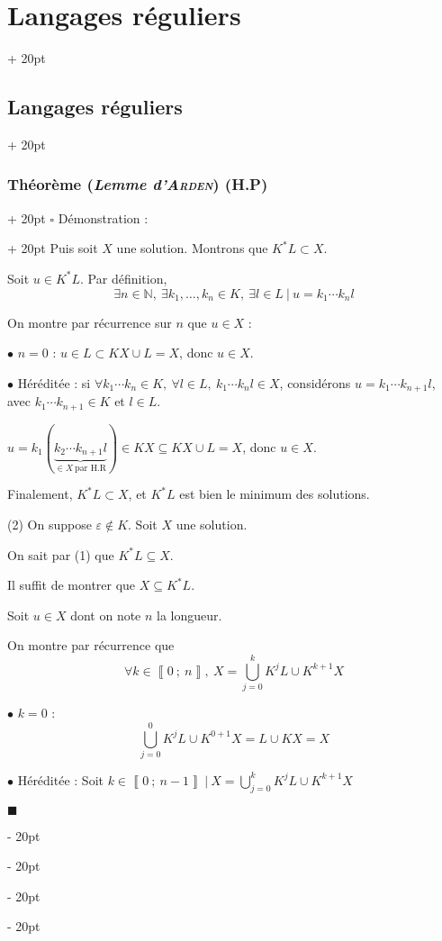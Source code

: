 \documentclass[a4paper, 12pt, twoside]{article}
\newcommand{\N}{\mathbb{N}} %
\newcommand{\nset}[2]{\left\llbracket #1\ ;\ #2 \right\rrbracket}
\newcommand{\ind}[1][20pt]{\advance\leftskip + #1}
\newcommand{\deind}[1][20pt]{\advance\leftskip - #1}
\newenvironment{indt}[2][20pt]{#2 \par \ind[#1]}{\par \deind} %
\newenvironment{proof}[1][{Démonstration :}]{\begin{indt}{$\square$ #1}}{$\blacksquare$ \end{indt}}
\begin{document}
\begin{indt}{\section{Langages réguliers}}
\begin{indt}{\subsection{Langages réguliers}}
\begin{indt}{\subsubsection{Théorème (\textit{Lemme d'\textsc{Arden}}) (H.P)}}
\begin{proof}
                    Puis soit $X$ une solution. Montrons que $K^* L \subset X$.

                    Soit $u \in K^* L$. Par définition,
                    \[
                        \exists n \in \N,\ \exists k_1, \ldots, k_n \in K,\ \exists l \in L\ |\
                        u = k_1 \cdots k_n l
                    \]

                    On montre par récurrence sur $n$ que $u \in X$ :

                    $\bullet$ $n = 0$ :
                    $u \in L \subset KX\cup L = X$, donc $u \in X$.

                    \vspace{6pt}
                    
                    $\bullet$ Héréditée :
                    si $\forall k_1 \cdots k_n \in K,\ \forall l \in L,\ k_1 \cdots k_n l \in X$, considérons $u = k_1 \cdots k_{n + 1} l$, avec $k_1 \cdots k_{n + 1} \in K$ et $l \in L$.

                    $u = k_1(\underbrace{k_2 \cdots k_{n + 1}l}_{\in X\ \text{par H.R}}) \in KX \subseteq KX \cup L = X$, donc $u \in X$.

                    Finalement, $K^* L \subset X$, et $K^*L$ est bien le minimum des solutions.

                    \vspace{12pt}
                    
                    (2) On suppose $\varepsilon \notin K$. Soit $X$ une solution.

                    On sait par (1) que $K^*L \subseteq X$.

                    Il suffit de montrer que $X \subseteq K^* L$.

                    Soit $u \in X$ dont on note $n$ la longueur.

                    On montre par récurrence que
                    \[
                        \forall k \in \nset 0 n,\ X = \bigcup_{j = 0}^k K^j L \cup K^{k + 1} X
                    \]

                    \vspace{6pt}
                    
                    $\bullet$ $k = 0$ :
                    \[
                        \bigcup_{j = 0}^0 K^j L \cup K^{0 + 1} X = L \cup KX = X
                    \]

                    $\bullet$ Héréditée : Soit $k \in \nset 0 {n - 1} \ |\ X = \displaystyle \bigcup_{j = 0}^k K^j L \cup K^{k + 1} X$


\end{proof}
\end{indt}
\end{indt}
\end{indt}
\end{document}
